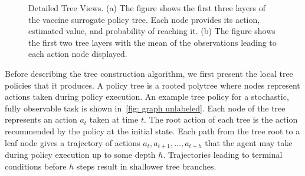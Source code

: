 \documentclass[letterpaper]{article} %
\begin{document}
\begin{figure}[ht!]
\begin{subfigure}[t]{0.43\textwidth}
    \caption{}\label{fig: detail b}
    \end{subfigure}
    \caption{Detailed Tree Views. (a) The figure shows the first three layers of the vaccine surrogate policy tree. Each node provides its action, estimated value, and probability of reaching it. (b) The figure shows the first two tree layers with the mean of the observations leading to each action node displayed.
        }
    \label{fig: example graph}
\end{figure}
Before describing the tree construction algorithm, we first present the local tree policies that it produces.
A policy tree is a rooted polytree where nodes represent actions taken during policy execution.
An example tree policy for a stochastic, fully observable task is shown in~\cref{fig: graph unlabeled}.
Each node of the tree represents an action $a_t$ taken at time $t$.
The root action of each tree is the action recommended by the policy at the initial state.
Each path from the tree root to a leaf node gives a trajectory of actions $a_t, a_{t+1}, \dots, a_{t + h}$ that the agent may take during policy execution up to some depth $h$.
Trajectories leading to terminal conditions before $h$ steps result in shallower tree branches.
\end{document}
